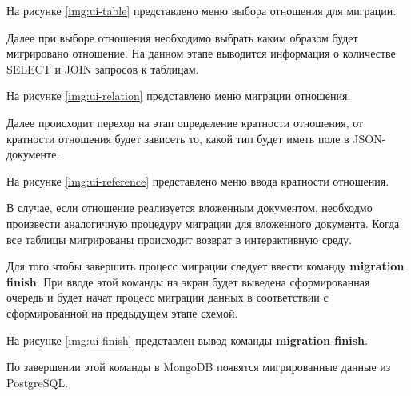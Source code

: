 На рисунке \ref{img:ui-table} представлено меню выбора отношения для миграции.

\clearpage

Далее при выборе отношения необходимо выбрать каким образом будет мигрировано отношение.
На данном этапе выводится информация о количестве SELECT и JOIN запросов к таблицам.

На рисунке \ref{img:ui-relation} представлено меню миграции отношения.

Далее происходит переход на этап определение кратности отношения, 
от кратности отношения будет зависеть то, какой тип будет иметь поле в JSON-документе.

\clearpage

На рисунке \ref{img:ui-reference} представлено меню ввода кратности отношения.


В случае, если отношение реализуется вложенным документом, 
необходмо произвести аналогичную процедуру миграции для вложенного документа.
Когда все таблицы мигрированы происходит возврат в интерактивную среду.

Для того чтобы завершить процесс миграции следует ввести команду \textbf{migration finish}.
При вводе этой команды на экран будет выведена сформированная очередь и будет начат процесс миграции данных
в соответствии с сформированной на предыдущем этапе схемой.

На рисунке \ref{img:ui-finish} представлен вывод команды \textbf{migration finish}.

По завершении этой команды в MongoDB появятся мигрированные данные из PostgreSQL.
